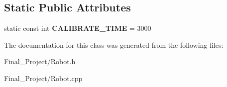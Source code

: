 \subsection*{Static Public Attributes}
\begin{DoxyCompactItemize}
\item 
\hypertarget{classRobot_ac40abfa06749a68604af90c00e2a3fee}{static const int {\bfseries C\-A\-L\-I\-B\-R\-A\-T\-E\-\_\-\-T\-I\-M\-E} = 3000}\label{classRobot_ac40abfa06749a68604af90c00e2a3fee}

\end{DoxyCompactItemize}


The documentation for this class was generated from the following files\-:\begin{DoxyCompactItemize}
\item 
Final\-\_\-\-Project/Robot.\-h\item 
Final\-\_\-\-Project/Robot.\-cpp\end{DoxyCompactItemize}
